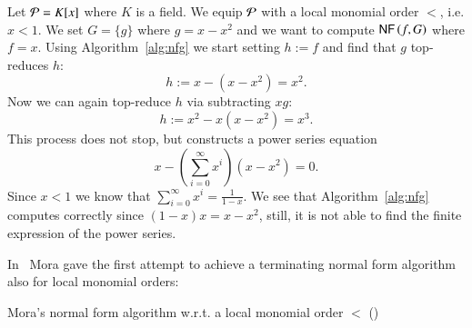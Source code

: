 \begin{example}
Let $\mathcal{P} = K[x]$ where $K$ is a field. We equip $\mathcal{P}$ with a local monomial
order $<$, i.e. $x < 1$. We set $G = \{g\}$ where $g=x-x^2$ and we want to
compute $\text{\sffamily{NF}}\left({f},{G}\right)$ where $f = x$. Using Algorithm~\ref{alg:nfg} we start setting
$h := f$ and find that $g$ top-reduces $h$:
\[h := x - \left(x-x^2\right) = x^2.\]
Now we can again top-reduce $h$ via subtracting $xg$:
\[h := x^2 - x\left(x-x^2\right) = x^3.\]
This process does not stop, but constructs a power series equation
\[x - \left(\sum_{i=0}^\infty x^i\right) \left(x-x^2\right) = 0.\]
Since $x<1$ we know that $\sum_{i=0}^\infty x^i = \frac{1}{1-x}$. We see that
Algorithm~\ref{alg:nfg} computes correctly since $(1-x) x = x-x^2$,
still, it is not able to find the finite expression of the power series.
\end{example}

In~\cite{mora82} Mora gave the first attempt to achieve a terminating normal
form algorithm also for local monomial orders:


\begin{algorithm}
\caption{Mora's normal form algorithm w.r.t. a local monomial order $<$
  (\nfn)} 
\label{alg:nfl}
\begin{algorithmic}[1]
\EndIf
{}
\EndWhile
{}
\end{algorithmic}
\end{algorithm}

